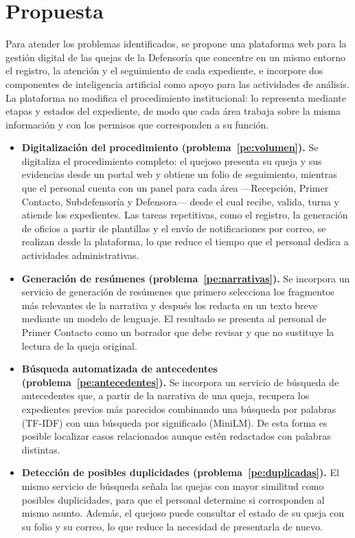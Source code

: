 	\section{Propuesta}
	\label{sec:propuesta}
	Para atender los problemas identificados, se propone una plataforma web para la gestión digital de las quejas de la Defensoría que concentre en un mismo entorno el registro, la atención y el seguimiento de cada expediente, e incorpore dos componentes de inteligencia artificial como apoyo para las actividades de análisis. La plataforma no modifica el procedimiento institucional: lo representa mediante etapas y estados del expediente, de modo que cada área trabaja sobre la misma información y con los permisos que corresponden a su función.

	\begin{itemize}
		\item \textbf{Digitalización del procedimiento (problema~\ref{pe:volumen}).} Se digitaliza el procedimiento completo: el quejoso presenta su queja y sus evidencias desde un portal web y obtiene un folio de seguimiento, mientras que el personal cuenta con un panel para cada área ---Recepción, Primer Contacto, Subdefensoría y Defensora--- desde el cual recibe, valida, turna y atiende los expedientes. Las tareas repetitivas, como el registro, la generación de oficios a partir de plantillas y el envío de notificaciones por correo, se realizan desde la plataforma, lo que reduce el tiempo que el personal dedica a actividades administrativas.

		\item \textbf{Generación de resúmenes (problema~\ref{pe:narrativas}).} Se incorpora un servicio de generación de resúmenes que primero selecciona los fragmentos más relevantes de la narrativa y después los redacta en un texto breve mediante un modelo de lenguaje. El resultado se presenta al personal de Primer Contacto como un borrador que debe revisar y que no sustituye la lectura de la queja original.

		\item \textbf{Búsqueda automatizada de antecedentes (problema~\ref{pe:antecedentes}).} Se incorpora un servicio de búsqueda de antecedentes que, a partir de la narrativa de una queja, recupera los expedientes previos más parecidos combinando una búsqueda por palabras (TF-IDF) con una búsqueda por significado (MiniLM). De esta forma es posible localizar casos relacionados aunque estén redactados con palabras distintas.

		\item \textbf{Detección de posibles duplicidades (problema~\ref{pe:duplicadas}).} El mismo servicio de búsqueda señala las quejas con mayor similitud como posibles duplicidades, para que el personal determine si corresponden al mismo asunto. Además, el quejoso puede consultar el estado de su queja con su folio y su correo, lo que reduce la necesidad de presentarla de nuevo.


\end{itemize}
